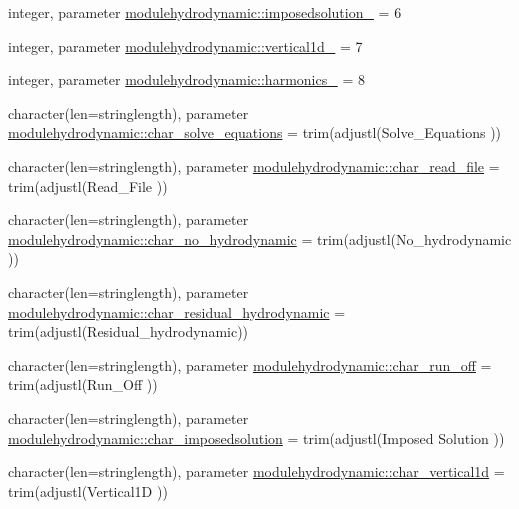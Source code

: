 \begin{DoxyCompactItemize}
\item 
integer, parameter \mbox{\hyperlink{namespacemodulehydrodynamic_a46f6dd5f0775b41bcb749a0798290b7b}{modulehydrodynamic\+::imposedsolution\+\_\+}} = 6
\item 
integer, parameter \mbox{\hyperlink{namespacemodulehydrodynamic_ac66894bee5bb658a00ab389caf0b81f4}{modulehydrodynamic\+::vertical1d\+\_\+}} = 7
\item 
integer, parameter \mbox{\hyperlink{namespacemodulehydrodynamic_a2a1d1197dc5c88ac8bf0ba967de08f81}{modulehydrodynamic\+::harmonics\+\_\+}} = 8
\item 
character(len=stringlength), parameter \mbox{\hyperlink{namespacemodulehydrodynamic_ad779cdc3636c017857bfb215293de5f9}{modulehydrodynamic\+::char\+\_\+solve\+\_\+equations}} = trim(adjustl(\textquotesingle{}Solve\+\_\+\+Equations\textquotesingle{} ))
\item 
character(len=stringlength), parameter \mbox{\hyperlink{namespacemodulehydrodynamic_a712275d1c62e5a85f4d398124d404651}{modulehydrodynamic\+::char\+\_\+read\+\_\+file}} = trim(adjustl(\textquotesingle{}Read\+\_\+\+File\textquotesingle{} ))
\item 
character(len=stringlength), parameter \mbox{\hyperlink{namespacemodulehydrodynamic_a4e8da1a28740ccba137f2ec1d40baac0}{modulehydrodynamic\+::char\+\_\+no\+\_\+hydrodynamic}} = trim(adjustl(\textquotesingle{}No\+\_\+hydrodynamic\textquotesingle{} ))
\item 
character(len=stringlength), parameter \mbox{\hyperlink{namespacemodulehydrodynamic_acb43993cccbfd0ba35d82ee368adf6fa}{modulehydrodynamic\+::char\+\_\+residual\+\_\+hydrodynamic}} = trim(adjustl(\textquotesingle{}Residual\+\_\+hydrodynamic\textquotesingle{}))
\item 
character(len=stringlength), parameter \mbox{\hyperlink{namespacemodulehydrodynamic_a594066c996ad89ed64e21d2401d31c92}{modulehydrodynamic\+::char\+\_\+run\+\_\+off}} = trim(adjustl(\textquotesingle{}Run\+\_\+\+Off\textquotesingle{} ))
\item 
character(len=stringlength), parameter \mbox{\hyperlink{namespacemodulehydrodynamic_a78cbfa7a6a863ae98d98b01e0ee6d7ae}{modulehydrodynamic\+::char\+\_\+imposedsolution}} = trim(adjustl(\textquotesingle{}Imposed Solution\textquotesingle{} ))
\item 
character(len=stringlength), parameter \mbox{\hyperlink{namespacemodulehydrodynamic_a2ea04eb9dae051db35d06bfca08f3814}{modulehydrodynamic\+::char\+\_\+vertical1d}} = trim(adjustl(\textquotesingle{}Vertical1D\textquotesingle{} ))

\end{DoxyCompactItemize}
